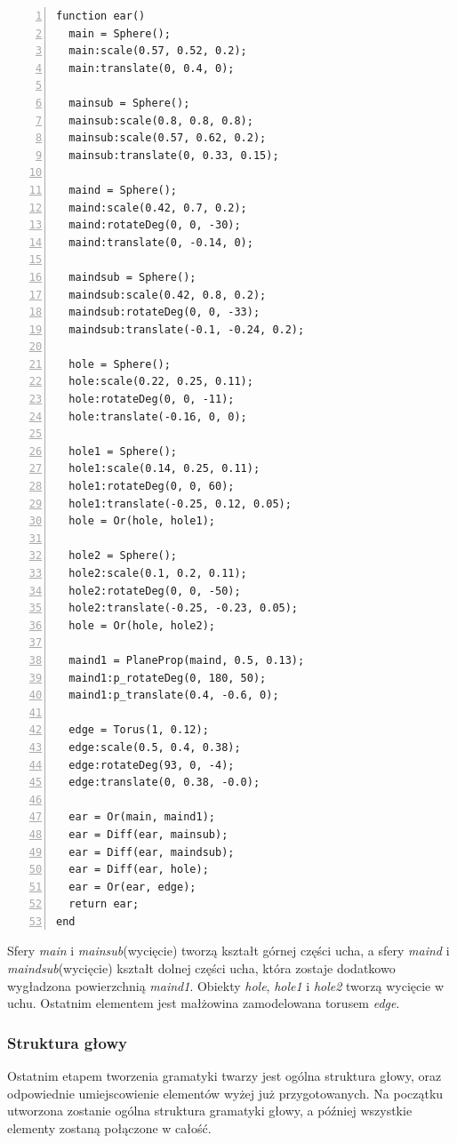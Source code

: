 {
\small
\begin{lstlisting}[numbers=left,frame=single,numberstyle=\tiny,backgroundcolor=\color{code_back},breaklines=true]
function ear()
  main = Sphere();
  main:scale(0.57, 0.52, 0.2);
  main:translate(0, 0.4, 0);
  
  mainsub = Sphere();
  mainsub:scale(0.8, 0.8, 0.8);
  mainsub:scale(0.57, 0.62, 0.2);
  mainsub:translate(0, 0.33, 0.15);
  
  maind = Sphere();
  maind:scale(0.42, 0.7, 0.2);
  maind:rotateDeg(0, 0, -30);
  maind:translate(0, -0.14, 0);
  
  maindsub = Sphere();
  maindsub:scale(0.42, 0.8, 0.2);
  maindsub:rotateDeg(0, 0, -33);
  maindsub:translate(-0.1, -0.24, 0.2);
  
  hole = Sphere();
  hole:scale(0.22, 0.25, 0.11);
  hole:rotateDeg(0, 0, -11);
  hole:translate(-0.16, 0, 0);
  
  hole1 = Sphere();
  hole1:scale(0.14, 0.25, 0.11);
  hole1:rotateDeg(0, 0, 60);
  hole1:translate(-0.25, 0.12, 0.05);
  hole = Or(hole, hole1);
  
  hole2 = Sphere();
  hole2:scale(0.1, 0.2, 0.11);
  hole2:rotateDeg(0, 0, -50);
  hole2:translate(-0.25, -0.23, 0.05);
  hole = Or(hole, hole2);
  
  maind1 = PlaneProp(maind, 0.5, 0.13);
  maind1:p_rotateDeg(0, 180, 50);
  maind1:p_translate(0.4, -0.6, 0);
  
  edge = Torus(1, 0.12);
  edge:scale(0.5, 0.4, 0.38);
  edge:rotateDeg(93, 0, -4);
  edge:translate(0, 0.38, -0.0);
  
  ear = Or(main, maind1);
  ear = Diff(ear, mainsub);
  ear = Diff(ear, maindsub);
  ear = Diff(ear, hole);
  ear = Or(ear, edge);
  return ear;
end
\end{lstlisting}
}

Sfery {\em main} i {\em mainsub}(wycięcie) tworzą kształt górnej części ucha, a
sfery {\em maind} i {\em maindsub}(wycięcie) kształt dolnej części ucha,
która zostaje dodatkowo wygładzona powierzchnią {\em maind1}. Obiekty {\em
hole}, {\em hole1} i {\em hole2} tworzą wycięcie w uchu. Ostatnim elementem
jest małżowina zamodelowana torusem {\em edge}.

\subsubsection{Struktura głowy}
Ostatnim etapem tworzenia gramatyki twarzy jest ogólna struktura głowy, oraz
odpowiednie umiejscowienie elementów wyżej już przygotowanych. Na początku
utworzona zostanie ogólna struktura gramatyki głowy, a później wszystkie
elementy zostaną połączone w całość.

